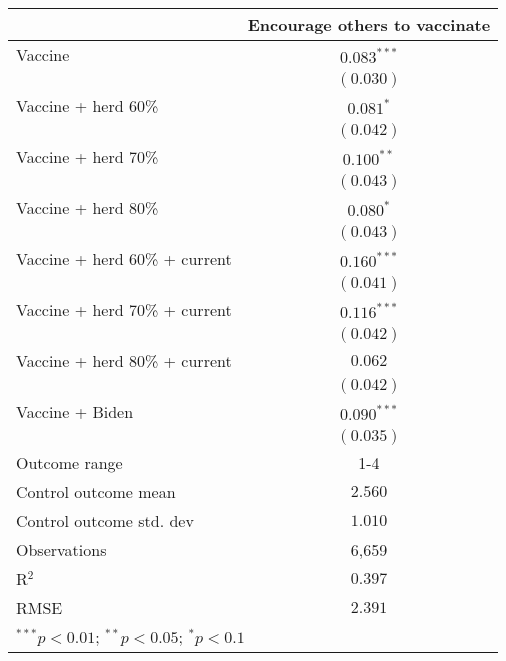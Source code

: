 \begin{table}
\begin{center}
\begin{tabular}{l c}
\hline
 & Encourage others to vaccinate \\
\hline
Vaccine                       & $0.083^{***}$ \\
                              & $(0.030)$     \\
Vaccine + herd 60\%           & $0.081^{*}$   \\
                              & $(0.042)$     \\
Vaccine + herd 70\%           & $0.100^{**}$  \\
                              & $(0.043)$     \\
Vaccine + herd 80\%           & $0.080^{*}$   \\
                              & $(0.043)$     \\
Vaccine + herd 60\% + current & $0.160^{***}$ \\
                              & $(0.041)$     \\
Vaccine + herd 70\% + current & $0.116^{***}$ \\
                              & $(0.042)$     \\
Vaccine + herd 80\% + current & $0.062$       \\
                              & $(0.042)$     \\
Vaccine + Biden               & $0.090^{***}$ \\
                              & $(0.035)$     \\
\hline
Outcome range                 & 1-4           \\
Control outcome mean          & $2.560$       \\
Control outcome std. dev      & $1.010$       \\
Observations                  & 6,659         \\
R$^{2}$                       & $0.397$       \\
RMSE                          & $2.391$       \\
\hline
\multicolumn{2}{l}{\scriptsize{$^{***}p<0.01$; $^{**}p<0.05$; $^{*}p<0.1$}}
\end{tabular}
\caption{}
\label{table:Tables and Figures/SI_table24_allinfo_pooled_encourage1-4}
\end{center}
\end{table}
